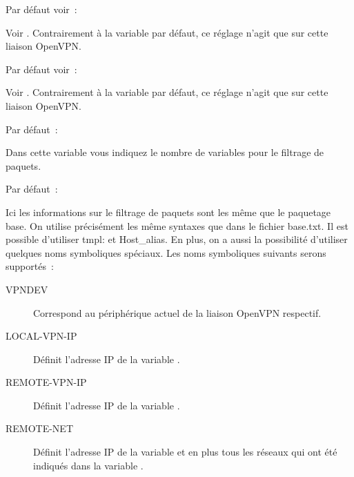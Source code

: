 \begin{description}

  Par défaut voir~: 

  Voir .
  Contrairement à la variable par défaut, ce réglage n'agit que sur cette liaison OpenVPN.


  Par défaut voir~: 

  Voir .
  Contrairement à la variable par défaut, ce réglage n'agit que sur cette liaison OpenVPN.


  Par défaut~: 

  Dans cette variable  vous indiquez le
  nombre de variables pour le filtrage de paquets.


  Par défaut~: 

  Ici les informations sur le filtrage de paquets sont les même que le paquetage
  base. On utilise précisément les même syntaxes que dans le fichier base.txt.
  Il est possible d'utiliser tmpl: et Host\_alias. En plus, on a aussi la
  possibilité d'utiliser quelques noms symboliques spéciaux. Les noms symboliques
  suivants serons supportés~:

\begin{description}

\item [VPNDEV] Correspond au périphérique actuel de la liaison OpenVPN respectif.

\item [LOCAL-VPN-IP] Définit l'adresse IP de la variable .

\item [REMOTE-VPN-IP] Définit l'adresse IP de la variable .

\item [REMOTE-NET] Définit l'adresse IP de la variable  et
  en plus tous les réseaux qui ont été indiqués dans la variable .


\end{description}
\end{description}
